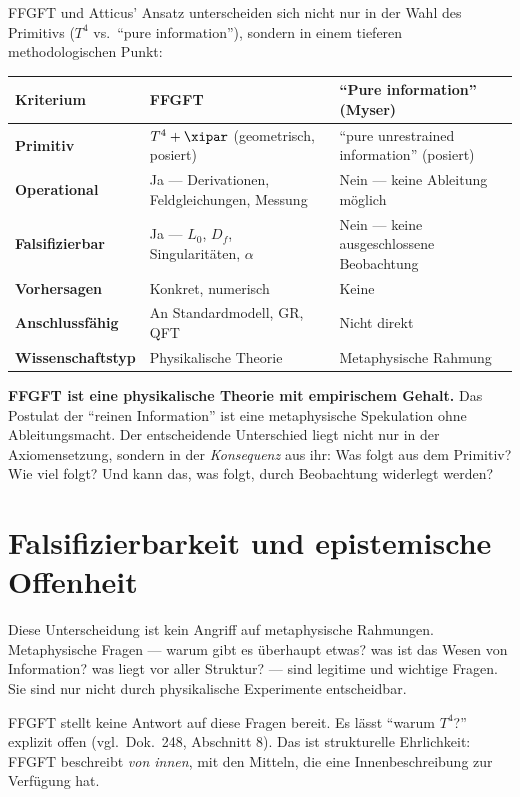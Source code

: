 FFGFT und Atticus' Ansatz unterscheiden sich nicht nur in der Wahl des Primitivs ($T^4$ vs.\ ``pure information''), sondern in einem tieferen methodologischen Punkt:

\begin{longtable}{>{\bfseries}p{3.5cm} p{5cm} p{5cm}}
\toprule
Kriterium & FFGFT & ``Pure information'' (Myser) \\
\midrule
Primitiv & $T^4 + \xipar$ (geometrisch, posiert) & ``pure unrestrained information'' (posiert) \\
Operational & Ja --- Derivationen, Feldgleichungen, Messung & Nein --- keine Ableitung möglich \\
Falsifizierbar & Ja --- $L_0$, $D_f$, Singularitäten, $\alpha$ & Nein --- keine ausgeschlossene Beobachtung \\
Vorhersagen & Konkret, numerisch & Keine \\
Anschlussfähig & An Standardmodell, GR, QFT & Nicht direkt \\
Wissenschaftstyp & Physikalische Theorie & Metaphysische Rahmung \\
\bottomrule
\end{longtable}

\begin{erkenntnis}
\textbf{FFGFT ist eine physikalische Theorie mit empirischem Gehalt.} Das Postulat der ``reinen Information'' ist eine metaphysische Spekulation ohne Ableitungsmacht. Der entscheidende Unterschied liegt nicht nur in der Axiomensetzung, sondern in der \emph{Konsequenz} aus ihr: Was folgt aus dem Primitiv? Wie viel folgt? Und kann das, was folgt, durch Beobachtung widerlegt werden?
\end{erkenntnis}

\section{Falsifizierbarkeit und epistemische Offenheit}

Diese Unterscheidung ist kein Angriff auf metaphysische Rahmungen. Metaphysische Fragen --- warum gibt es überhaupt etwas? was ist das Wesen von Information? was liegt vor aller Struktur? --- sind legitime und wichtige Fragen. Sie sind nur nicht durch physikalische Experimente entscheidbar.

FFGFT stellt keine Antwort auf diese Fragen bereit. Es lässt ``warum $T^4$?'' explizit offen (vgl.\ Dok.~248, Abschnitt 8). Das ist strukturelle Ehrlichkeit: FFGFT beschreibt \emph{von innen}, mit den Mitteln, die eine Innenbeschreibung zur Verfügung hat.

